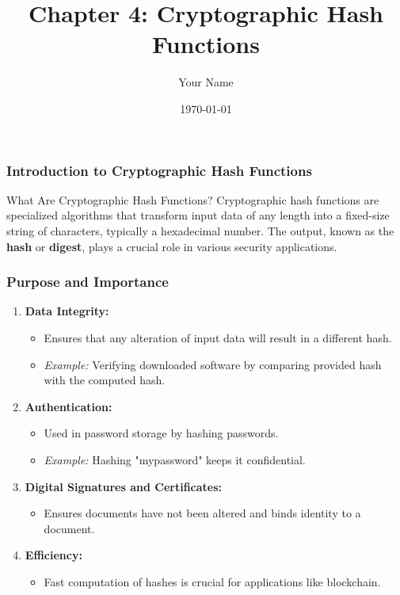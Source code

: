 \documentclass{beamer}
\title{Chapter 4: Cryptographic Hash Functions}
\author{Your Name}
\institute{Your Institution}
\date{\today}
\begin{document}
\frame{\titlepage}

\begin{frame}[fragile]
    \frametitle{Introduction to Cryptographic Hash Functions}
    \begin{block}{What Are Cryptographic Hash Functions?}
        Cryptographic hash functions are specialized algorithms that transform input data of any length into a fixed-size string of characters, typically a hexadecimal number. The output, known as the \textbf{hash} or \textbf{digest}, plays a crucial role in various security applications.
    \end{block}
\end{frame}

\begin{frame}[fragile]
    \frametitle{Purpose and Importance}
    \begin{enumerate}
        \item \textbf{Data Integrity:}
            \begin{itemize}
                \item Ensures that any alteration of input data will result in a different hash.
                \item \textit{Example:} Verifying downloaded software by comparing provided hash with the computed hash.
            \end{itemize}
        \item \textbf{Authentication:}
            \begin{itemize}
                \item Used in password storage by hashing passwords.
                \item \textit{Example:} Hashing "mypassword" keeps it confidential.
            \end{itemize}
        \item \textbf{Digital Signatures and Certificates:}
            \begin{itemize}
                \item Ensures documents have not been altered and binds identity to a document.
            \end{itemize}
        \item \textbf{Efficiency:}
            \begin{itemize}
                \item Fast computation of hashes is crucial for applications like blockchain.
            \end{itemize}
    \end{enumerate}
\end{frame}
\end{document}
